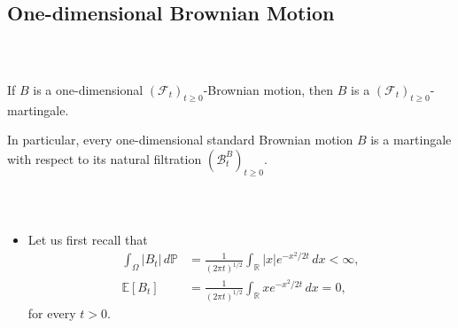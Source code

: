\documentclass{beamer}
\numberwithin{equation}{section}
\newcommand{\task}[1]{
    \begin{center}
        \colorbox{red}{
            \textsf{
                \textbf{#1}
            }
        }
    \end{center}
}
\newenvironment{frame2}{\begin{frame}\frametitle{{\normalsize \secname} \\ {\large \subsecname}}}{\end{frame}}
\begin{document}
\subsection{One-dimensional Brownian Motion}

\begin{frame2}
    If $B$ is a one-dimensional $(\mathcal{F}_t)_{t\geq 0}$-Brownian motion, then $B$ is a $(\mathcal{F}_t)_{t\geq 0}$-martingale.

    In particular, every one-dimensional standard Brownian motion $B$ is a martingale with respect to its natural filtration $(\mathcal{B}_t^B)_{t\geq 0}$.
\end{frame2}

\begin{frame2}
    \begin{itemize} 
        \item Let us first recall that
        \begin{align}
            \int_{\Omega} |B_t| \, d\mathbb{P} &= \frac{1}{(2\pi t)^{1/2}}\int_\mathbb{R} |x| e^{-x^2/2t} \, dx < \infty, \\
            \mathbb{E}[B_t] &= \frac{1}{(2\pi t)^{1/2}}\int_\mathbb{R}xe^{-x^2/2t} \, dx = 0,
        \end{align}
        for every $t > 0$.
    \end{itemize}
\end{frame2}
\end{document}
